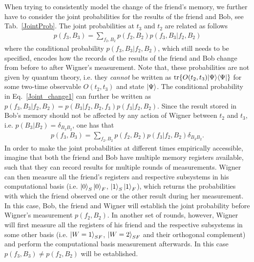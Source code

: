 \documentclass[a4paper,twocolumn,11pt,accepted=2017-05-09,dvipsnames]{quantumarticle}
\numberwithin{equation}{section}
\newcommand{\proj}[1]{|#1\rangle\langle#1|}
\begin{document}
When trying to consistently model the change of the friend's memory, we further have to consider the joint probabilities for the results of the friend and Bob, see Tab.~\ref{JointProb}. The joint probabilities at $t_3$ and $t_2$ are related as follows
\begin{align}
\label{Joint_change1}
p(f_3,B_3)=\sum_{f_2,B_2} p(f_2,B_2)p(f_3,B_3|f_2,B_2) 
\end{align}
where the conditional probability $p(f_3,B_3|f_2,B_2)$, which still needs to be specified, encodes how the records of the results of the friend and Bob change from before to after Wigner's measurement. Note that, these probabilities are not given by quantum theory, i.e. they \emph{cannot} be written as $\tr{O(t_2,t_3)\proj{\Psi}}$ for some two-time observable $O(t_2,t_3)$ and state $\ket{\Psi}$. The conditional probability in Eq.~\eqref{Joint_change1} can further be written as $p(f_3,B_3|f_2,B_2)=p(B_3|f_2,B_2,f_3)p(f_3|f_2,B_2)$. Since the result stored in Bob's memory should not be affected by any action of Wigner between $t_2$ and $t_3$, i.e. $p(B_3|B_2)=\delta_{B_3B_2}$, one has that 
\begin{align}
\label{Joint_change2}
p(f_3,B_3)=\sum_{f_2,B_2} p(f_2,B_2) p(f_3|f_2,B_2) \delta_{B_3B_2}. 
\end{align}
In order to make the joint probabilities at different times empirically accessible, imagine that both the friend and Bob have multiple memory registers available, such that they can record results for multiple rounds of measurements. Wigner can then measure all the friend's registers and respective subsystems in his computational basis (i.e. $\ket{0}_S\ket{0}_F$, $\ket{1}_S\ket{1}_F$), which returns the probabilities with which the friend observed one or the other result during her measurement. In this case, Bob, the friend and Wigner will establish the joint probability before Wigner's measurement $p(f_2,B_2)$. In another set of rounds, however, Wigner will first measure all the registers of his friend and the respective subsystems in some other basis (i.e. $\ket{W=1}_{SF}$, $\ket{W=2}_{SF}$ and their orthogonal complement) and perform the computational basis measurement afterwards. In this case $p(f_3,B_3)\neq p(f_2,B_2)$ will be established. \\
\end{document}
